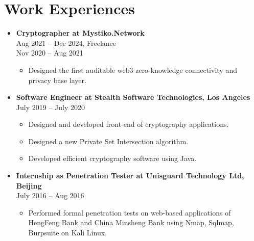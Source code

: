 \documentclass[a4paper,12pt]{article}
\begin{document}
\section*{Work Experiences}
\begin{itemize}[left=0pt, label={}, parsep=0pt]
    \item \textbf{Cryptographer at Mystiko.Network} \\
    Aug 2021 – Dec 2024, Freelance\\
    Nov 2020 – Aug 2021
    \begin{itemize}[left=0pt,label=\textbullet,topsep=0pt]
        \item Designed the first auditable web3 zero-knowledge connectivity and privacy base layer.
    \end{itemize}
    \item \textbf{Software Engineer at Stealth Software Technologies, Los Angeles} \\
    July 2019 – July 2020 
    \begin{itemize}[left=0pt,label=\textbullet,topsep=0pt]
        \item Designed and developed front-end of cryptography applications. 
        \item Designed a new Private Set Intersection algorithm. 
        \item Developed efficient cryptography software using Java.
    \end{itemize}
    \item \textbf{Internship as Penetration Tester at Unisguard Technology Ltd, Beijing} \\
    July 2016 – Aug 2016 
    \begin{itemize}[left=0pt,label=\textbullet,topsep=0pt]
        \item Performed formal penetration tests on web-based applications of HengFeng Bank and China Minsheng Bank using Nmap, Sqlmap, Burpsuite on Kali Linux.
    \end{itemize}
\end{itemize}
\end{document}
